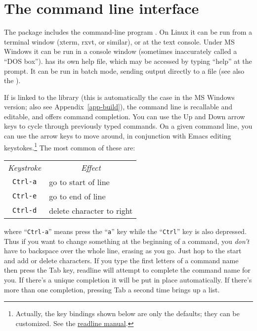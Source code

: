 \chapter{The command line interface}
\label{cli}

The  package includes the command-line program
.  On Linux it can be run from a terminal window (xterm,
rxvt, or similar), or at the text console.  Under MS Windows it can be
run in a console window (sometimes inaccurately called a ``DOS box'').
 has its own help file, which may be accessed by typing
``help'' at the prompt. It can be run in batch mode, sending output
directly to a file (see also the \GCR).
    
If  is linked to the  library (this is
automatically the case in the MS Windows version; also see
Appendix~\ref{app-build}), the command line is recallable and
editable, and offers command completion.  You can use the Up and Down
arrow keys to cycle through previously typed commands.  On a given
command line, you can use the arrow keys to move around, in
conjunction with Emacs editing keystokes.\footnote{Actually, the key
  bindings shown below are only the defaults; they can be customized.
  See the
  \href{http://cnswww.cns.cwru.edu/~chet/readline/readline.html}{readline
    manual}.} The most common of these are:
%    
\begin{center}
  \begin{tabular}{cl}
    \textit{Keystroke} & \multicolumn{1}{c}{\textit{Effect}}\\
    \verb+Ctrl-a+ & go to start of line\\
    \verb+Ctrl-e+ & go to end of line\\
    \verb+Ctrl-d+ & delete character to right\\
  \end{tabular}
\end{center}
%
where ``\verb+Ctrl-a+'' means press the ``\verb+a+'' key while the
``\verb+Ctrl+'' key is also depressed.  Thus if you want to change
something at the beginning of a command, you \emph{don't} have to
backspace over the whole line, erasing as you go.  Just hop to the
start and add or delete characters.  If you type the first letters of
a command name then press the Tab key, readline will attempt to
complete the command name for you.  If there's a unique completion it
will be put in place automatically.  If there's more than one
completion, pressing Tab a second time brings up a list.

